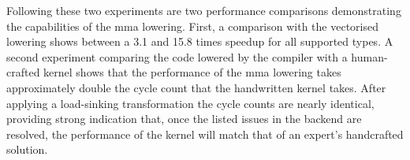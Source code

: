 \documentclass[\main/thesis.tex]{subfiles}
\begin{document}
Following these two experiments are two performance comparisons demonstrating the capabilities of the \gls{mma} \gls{lowering}.
First, a comparison with the vectorised \gls{lowering} shows between a 3.1 and 15.8 times speedup for all supported types.
A second experiment comparing the code lowered by the compiler with a human-crafted kernel shows that the performance of the \gls{mma} \gls{lowering} takes approximately double the cycle count that the handwritten kernel takes.
After applying a load-sinking transformation the cycle counts are nearly identical, providing strong indication that, once the listed issues in the backend are resolved, the performance of the kernel will match that of an expert's handcrafted solution.
\end{document}
